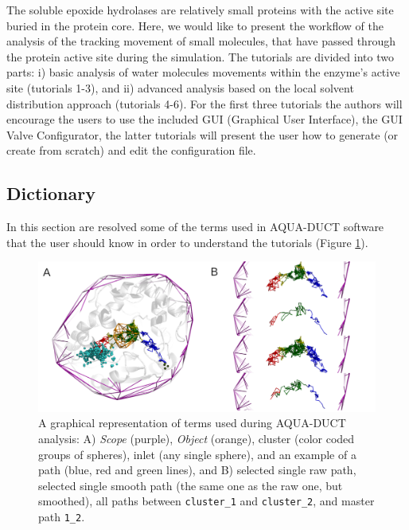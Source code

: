 \documentclass[9pt,tutorial]{livecoms}
\begin{document}
The soluble epoxide hydrolases are relatively small proteins with the active site buried in the protein core. Here, we would like to present the workflow of the analysis of the tracking movement of small molecules, that have passed through the protein active site during the simulation. The tutorials are divided into two parts: i) basic analysis of water molecules movements within the enzyme's active site (tutorials 1-3), and ii) advanced analysis based on the local solvent distribution approach (tutorials 4-6). For the first three tutorials the authors will encourage the users to use the included GUI (Graphical User Interface), the GUI Valve Configurator, the latter tutorials will present the user how to generate (or create from scratch) and edit the configuration file.
 
\subsection{Dictionary}

In this section are resolved some of the terms used in AQUA-DUCT software that the user should know in order to understand the tutorials (Figure \ref{Dict}).

\begin{figure}[ht!]
\centering
\includegraphics[width=\textwidth]{dictionary.png}
\caption{A graphical representation of terms used during AQUA-DUCT analysis: A) \emph{Scope} (purple), \emph{Object} (orange), cluster (color coded groups of spheres), inlet (any single sphere), and an example of a path (blue, red and green lines), and B) selected single raw path, selected single smooth path (the same one as the raw one, but smoothed), all paths between \texttt{cluster\_1} and \texttt{cluster\_2}, and master path \texttt{1\_2}.}
\label{Dict}
\end{figure}
\end{document}
